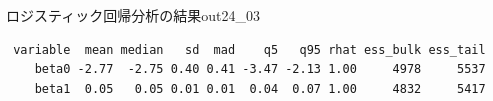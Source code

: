 \begin{SCrstan}{ロジスティック回帰分析の結果}{out24_03}
	\begin{verbatim}
 variable  mean median   sd  mad    q5   q95 rhat ess_bulk ess_tail
    beta0 -2.77  -2.75 0.40 0.41 -3.47 -2.13 1.00     4978     5537
    beta1  0.05   0.05 0.01 0.01  0.04  0.07 1.00     4832     5417
\end{verbatim}
\end{SCrstan}

